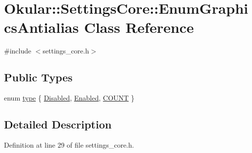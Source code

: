 \hypertarget{classOkular_1_1SettingsCore_1_1EnumGraphicsAntialias}{\section{Okular\+:\+:Settings\+Core\+:\+:Enum\+Graphics\+Antialias Class Reference}
\label{classOkular_1_1SettingsCore_1_1EnumGraphicsAntialias}
}


{\ttfamily \#include $<$settings\+\_\+core.\+h$>$}

\subsection*{Public Types}
\begin{DoxyCompactItemize}
\item 
enum \hyperlink{classOkular_1_1SettingsCore_1_1EnumGraphicsAntialias_a124c4398a0feb1b529fbae0accbc89ce}{type} \{ \hyperlink{classOkular_1_1SettingsCore_1_1EnumGraphicsAntialias_a124c4398a0feb1b529fbae0accbc89cea7dd89822738b507cbbc1683ab9dfce48}{Disabled}, 
\hyperlink{classOkular_1_1SettingsCore_1_1EnumGraphicsAntialias_a124c4398a0feb1b529fbae0accbc89cead7142b8fc6f562d888be519480612e7c}{Enabled}, 
\hyperlink{classOkular_1_1SettingsCore_1_1EnumGraphicsAntialias_a124c4398a0feb1b529fbae0accbc89ceaf7b16ffad41eff848ce4c9af7be06dc2}{C\+O\+U\+N\+T}
 \}
\end{DoxyCompactItemize}


\subsection{Detailed Description}


Definition at line 29 of file settings\+\_\+core.\+h.



